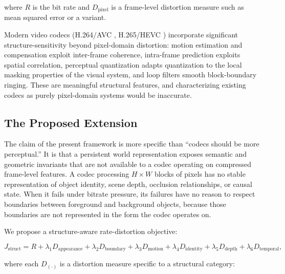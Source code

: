 \documentclass[11pt,a4paper]{article}
\theoremstyle{plain}
\theoremstyle{definition}
\theoremstyle{remark}
\begin{document}
where $R$ is the bit rate and $D_{\mathrm{pixel}}$ is a frame-level distortion measure such as mean squared error or a variant.

Modern video codecs (H.264/AVC \cite{wiegand2003}, H.265/HEVC \cite{sullivan2012}) incorporate significant structure-sensitivity beyond pixel-domain distortion: motion estimation and compensation exploit inter-frame coherence, intra-frame prediction exploits spatial correlation, perceptual quantization adapts quantization to the local masking properties of the visual system, and loop filters smooth block-boundary ringing. These are meaningful structural features, and characterizing existing codecs as purely pixel-domain systems would be inaccurate.

\subsection{The Proposed Extension}

The claim of the present framework is more specific than ``codecs should be more perceptual.'' It is that a persistent world representation exposes semantic and geometric invariants that are not available to a codec operating on compressed frame-level features. A codec processing $H \times W$ blocks of pixels has no stable representation of object identity, scene depth, occlusion relationships, or causal state. When it fails under bitrate pressure, its failures have no reason to respect boundaries between foreground and background objects, because those boundaries are not represented in the form the codec operates on.

We propose a structure-aware rate-distortion objective:

\[
J_{\mathrm{struct}} = R + \lambda_1 D_{\mathrm{appearance}} + \lambda_2 D_{\mathrm{boundary}} + \lambda_3 D_{\mathrm{motion}} + \lambda_4 D_{\mathrm{identity}} + \lambda_5 D_{\mathrm{depth}} + \lambda_6 D_{\mathrm{temporal}},
\]

where each $D_{\mathrm{(\cdot)}}$ is a distortion measure specific to a structural category:
\end{document}
